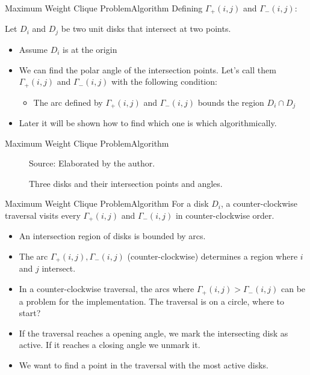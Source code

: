 \documentclass{beamer}
\newcommand{\source}[1]{\caption*{Source: {#1}} }
\begin{document}
\begin{frame}{Maximum Weight Clique Problem}{Algorithm}
	Defining $\Gamma_+(i,j)$ and $\Gamma_-(i,j)$:
	
	Let $D_i$ and $D_j$ be two unit disks that intersect at two points.
	
	\begin{itemize}
		\item Assume $D_i$ is at the origin
		\item We can find the polar angle of the intersection points. Let's call them $\Gamma_+(i,j)$ and $\Gamma_-(i,j)$ with the following condition:
		\begin{itemize}
			\item The arc defined by $\Gamma_+(i,j)$ and $\Gamma_-(i,j)$ bounds the region $D_i \cap D_j$
			
		\end{itemize}
		\item Later it will be shown how to find which one is which algorithmically.
	\end{itemize}
\end{frame}

\begin{frame}{Maximum Weight Clique Problem}{Algorithm}
	\begin{figure}[H]
		\centering
		
		\caption{Three disks and their intersection points and angles.}
		
		\source{Elaborated by the author.}
		\label{fig:3disks_intersect}
	\end{figure}
\end{frame}


\begin{frame}{Maximum Weight Clique Problem}{Algorithm}
	For a disk $D_i$, a counter-clockwise traversal visits every $\Gamma_+(i,j)$ and $\Gamma_-(i,j)$ in counter-clockwise order.
	
	\begin{itemize}
		\item An intersection region of disks is bounded by arcs.
		
		\item The arc $\Gamma_+(i,j),\Gamma_-(i,j)$ (counter-clockwise) determines a region where $i$ and $j$ intersect.
		
		\item In a counter-clockwise traversal, the arcs where $\Gamma_+(i,j) > \Gamma_-(i,j)$ can be a problem for the implementation. The traversal is on a circle, where to start?
		
		\item If the traversal reaches a opening angle, we mark the intersecting disk as active. If it reaches a closing angle we unmark it.
		
		\item We want to find a point in the traversal with the most active disks.
	\end{itemize}
\end{frame}
\end{document}

